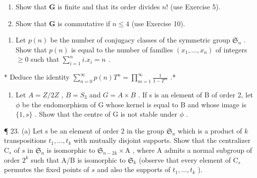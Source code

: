 \begin{enumerate}
\def\labelenumi{(\alph{enumi})}
\item
  Show that \(\mathbf{G}\) is finite and that its order divides \(n!\) (use Exercise 5).
\item
  Show that \(\mathbf{G}\) is commutative if \(n \leqslant 4\) (use Exercise 10).
\end{enumerate}

\begin{enumerate}
\def\labelenumi{\arabic{enumi}.}
\setcounter{enumi}{20}
\tightlist
\item
  Let \(p(n)\) be the number of conjugacy classes of the symmetric group \(\mathfrak{S}_n\) . Show that \(p(n)\) is equal to the number of families \((x_1, \ldots, x_n)\) of integers \(\geqslant 0\) such that \(\sum_{i=1}^{n} i.x_i = n\) .
\end{enumerate}

* Deduce the identity \(\sum_{n=0}^{\infty} p(n) T^n = \prod_{m=1}^{\infty} \frac{1}{1 - T^m}\) .*

\begin{enumerate}
\def\labelenumi{\arabic{enumi}.}
\setcounter{enumi}{21}
\tightlist
\item
  Let \(A = Z/2Z\) , \(B = S_{3}\) and \(G = A \times B\) . If s is an element of B of order 2, let \(\phi\) be the endomorphism of G whose kernel is equal to B and whose image is \(\{1, s\}\) . Show that the centre of G is not stable under \(\phi\) .
\end{enumerate}

¶ 23. (a) Let s be an element of order 2 in the group \(\mathfrak{S}_n\) which is a product of \(k\) transpositions \(t_1, \ldots, t_k\) with mutually disjoint supports. Show that the centralizer \(\mathrm{C}_s\) of \(s\) in \(\mathfrak{S}_n\) is isomorphic to \(\mathfrak{S}_{n-2k} \times \mathrm{A}\) , where A admits a normal subgroup of order \(2^k\) such that A/B is isomorphic to \(\mathfrak{S}_k\) (observe that every element of \(\mathrm{C}_s\) permutes the fixed points of \(s\) and also the supports of \(t_1, \ldots, t_k\) ).

